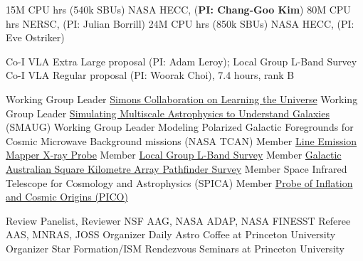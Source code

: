 \documentclass[12pt]{article}
\begin{document}

{15M CPU hrs (540k SBUs)}
{NASA HECC, ({\bf PI: Chang-Goo Kim})}
{80M CPU hrs}
{NERSC, (PI: Julian Borrill)}
{24M CPU hrs (850k SBUs)}
{NASA HECC, (PI: Eve Ostriker)}


{Co-I}
{VLA Extra Large proposal (PI: Adam Leroy); Local Group L-Band Survey}
{Co-I}
{VLA Regular proposal (PI: Woorak Choi), 7.4 hours, rank B}


{Working Group Leader}
{\href{https://www.learning-the-universe.org}{Simons Collaboration on Learning the Universe}}
{Working Group Leader}
{{\href{https://www.simonsfoundation.org/flatiron/center-for-computational-astrophysics/galaxy-formation/smaug/}{Simulating Multiscale Astrophysics to Understand Galaxies} (SMAUG)}}
{Working Group Leader}
{Modeling Polarized Galactic Foregrounds for Cosmic Microwave Background missions (NASA TCAN)}
{Member}
{\href{http://lem.cfa.harvard.edu}{Line Emission Mapper X-ray Probe}}
{Member}
{\href{https://www.lglbs.org}{Local Group L-Band Survey}}
{Member}
{\href{https://gaskap.anu.edu.au}{Galactic Australian Square Kilometre Array Pathfinder Survey}}
{Member}
{Space Infrared Telescope for Cosmology and Astrophysics (SPICA)}
{Member}
{\href{https://zzz.physics.umn.edu/!ipsig/}{Probe of Inflation and Cosmic Origins (PICO)}}


{Review Panelist, Reviewer}
{NSF AAG, NASA ADAP, NASA FINESST}
{Referee}
{AAS, MNRAS, JOSS}
{Organizer}
{Daily Astro Coffee at Princeton University}
{Organizer}
{Star Formation/ISM Rendezvous Seminars at Princeton University}
\end{document}
